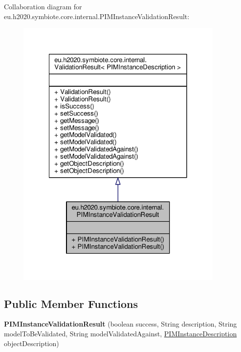 Collaboration diagram for eu.\+h2020.\+symbiote.\+core.\+internal.\+P\+I\+M\+Instance\+Validation\+Result\+:
\nopagebreak
\begin{figure}[H]
\begin{center}
\leavevmode
\includegraphics[width=290pt]{classeu_1_1h2020_1_1symbiote_1_1core_1_1internal_1_1PIMInstanceValidationResult__coll__graph}
\end{center}
\end{figure}
\subsection*{Public Member Functions}
\begin{DoxyCompactItemize}
\item 
\mbox{\label{classeu_1_1h2020_1_1symbiote_1_1core_1_1internal_1_1PIMInstanceValidationResult_ae79dd445e2db88f36f014125514c1570}} 
{\bfseries P\+I\+M\+Instance\+Validation\+Result} (boolean success, String description, String model\+To\+Be\+Validated, String model\+Validated\+Against, \hyperlink{classeu_1_1h2020_1_1symbiote_1_1core_1_1internal_1_1PIMInstanceDescription}{P\+I\+M\+Instance\+Description} object\+Description)
\end{DoxyCompactItemize}


